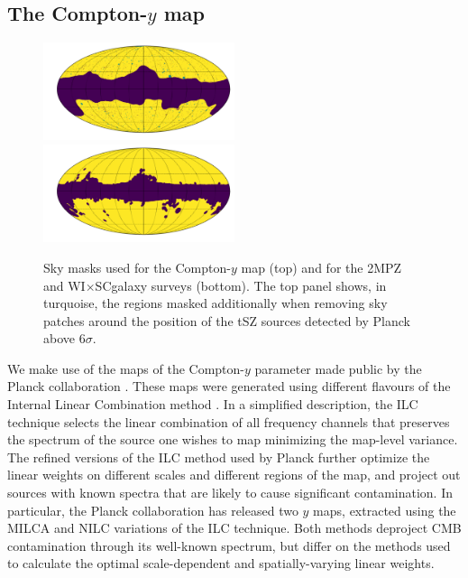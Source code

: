 \documentclass[useAMS,usenatbib]{mn2e}
\newcommand{\wisc}{WI$\times$SC}
\begin{document}
  \subsection{The Compton-$y$ map}\label{ssec:data.y}
    \begin{figure}
      \centering
      \includegraphics[width=0.5\textwidth]{./figures/mask_y.pdf}
      \includegraphics[width=0.5\textwidth]{./figures/mask_g.pdf}
      \caption{Sky masks used for the Compton-$y$ map (top) and for the 2MPZ and \wisc galaxy surveys (bottom). The top panel shows, in turquoise, the regions masked additionally when removing sky patches around the position of the tSZ sources detected by Planck above 6$\sigma$.}
      \label{fig:msk}
    \end{figure}
    We make use of the maps of the Compton-$y$ parameter made public by the Planck collaboration \cite{2016A&A...594A..22P}. These maps were generated using different flavours of the Internal Linear Combination method \cite{2004ApJ...612..633E,2008arXiv0811.4277V}. In a simplified description, the ILC technique selects the linear combination of all frequency channels that preserves the spectrum of the source one wishes to map minimizing the map-level variance. The refined versions of the ILC method used by Planck further optimize the linear weights on different scales and different regions of the map, and project out sources with known spectra that are likely to cause significant contamination. In particular, the Planck collaboration has released two $y$ maps, extracted using the MILCA \citep{2013A&A...558A.118H} and NILC \cite{2011MNRAS.410.2481R} variations of the ILC technique. Both methods deproject CMB contamination through its well-known spectrum, but differ on the methods used to calculate the optimal scale-dependent and spatially-varying linear weights.
    
\end{document}
